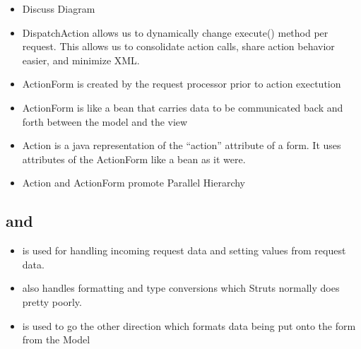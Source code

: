 \begin{ifhtml}
\begin{s5slide}
    \begin{slideshow}
      \item {}
    \end{slideshow}
    
    \begin{s5notes}
      \begin{itemize}
      \item Discuss Diagram
      \item DispatchAction allows us to dynamically change execute() method per request. This allows us to consolidate action calls, share action behavior easier, and minimize XML.
      \item ActionForm is created by the request processor prior to action exectution
      \item ActionForm is like a bean that carries data to be communicated back and forth between the model and the view
      \item Action is a java representation of the ``action'' attribute of a form. It uses attributes of the ActionForm like a bean as it were.
      \item Action and ActionForm promote Parallel Hierarchy
      \end{itemize}
    \end{s5notes}
  \end{s5slide}

  \begin{s5slide}
    \section{ and }
    \begin{itemize}
      \item {} is used for handling incoming request data and setting  values from request data.
      \item {} also handles formatting and type conversions which Struts normally does pretty poorly.
      \item {} is used to go the other direction which formats data being put onto the form from the Model
    \end{itemize}
    

\end{s5slide}
\end{ifhtml}
